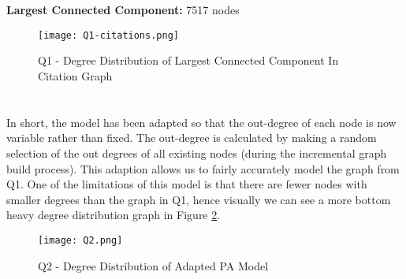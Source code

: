 \section{}
\textbf{Largest Connected Component: } 7517 nodes

\begin{figure}[h!]
    \begin{center}
        \texttt{[image: Q1-citations.png]}
        \caption{Q1 - Degree Distribution of Largest Connected Component In Citation Graph}
        \label{fig:Q1}
    \end{center}
\end{figure}

\section{}
In short, the model has been adapted so that the out-degree of each node is now variable rather than fixed.
The out-degree is calculated by making a random selection of the out degrees of all existing nodes (during the incremental graph build process).
This adaption allows us to fairly accurately model the graph from Q1.
One of the limitations of this model is that there are fewer nodes with smaller degrees than the graph in Q1, hence visually we can see a more bottom heavy degree distribution graph in Figure \ref{fig:Q2}. 
\begin{figure}[h!]
    \begin{center}
        \texttt{[image: Q2.png]}
        \caption{Q2 - Degree Distribution of Adapted PA Model}
        \label{fig:Q2}
    \end{center}
\end{figure}